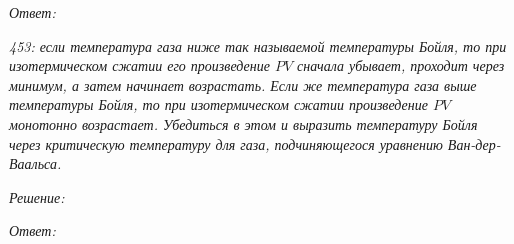 \documentclass[pscyr]{hedsemwork}
\begin{document}
\vspace*{2em}
\emph{Ответ:}

\newpage %

\emph{453: если температура газа ниже так называемой температуры Бойля, то при
изотермическом сжатии его произведение \( PV \) сначала убывает, проходит через
минимум, а затем начинает возрастать. Если же температура газа выше температуры
Бойля, то при изотермическом сжатии произведение \( PV \) монотонно возрастает.
Убедиться в этом и выразить температуру Бойля через критическую температуру для
газа, подчиняющегося уравнению Ван-дер-Ваальса.}

\vspace*{2em}
\emph{Решение:}

\vspace*{2em}
\emph{Ответ:}
\end{document}
